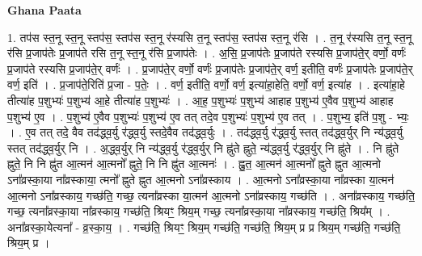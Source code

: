 \documentclass[17pt]{extarticle}
\begin{document}
\textbf{Ghana Paata } \newline

1. तप॑स स्त॒नू स्त॒नू स्तप॑स॒ स्तप॑स स्त॒नू र॑स्यसि त॒नू स्तप॑स॒ स्तप॑स स्त॒नू र॑सि । . त॒नू र॑स्यसि त॒नू स्त॒नू र॑सि प्र॒जाप॑तेः प्र॒जाप॑ते रसि त॒नू स्त॒नू र॑सि प्र॒जाप॑तेः । . अ॒सि॒ प्र॒जाप॑तेः प्र॒जाप॑ते रस्यसि प्र॒जाप॑ते॒र् वर्णो॒ वर्णः॑ प्र॒जाप॑ते रस्यसि प्र॒जाप॑ते॒र् वर्णः॑ । . प्र॒जाप॑ते॒र् वर्णो॒ वर्णः॑ प्र॒जाप॑तेः प्र॒जाप॑ते॒र् वर्ण॒ इतीति॒ वर्णः॑ प्र॒जाप॑तेः प्र॒जाप॑ते॒र् वर्ण॒ इति॑ । . प्र॒जाप॑ते॒रिति॑ प्र॒जा - प॒तेः॒ । . वर्ण॒ इतीति॒ वर्णो॒ वर्ण॒ इत्या॑हा॒हेति॒ वर्णो॒ वर्ण॒ इत्या॑ह । . इत्या॑हा॒हे तीत्या॑ह प॒शुभ्यः॑ प॒शुभ्य॑ आ॒हे तीत्या॑ह प॒शुभ्यः॑ । . आ॒ह॒ प॒शुभ्यः॑ प॒शुभ्य॑ आहाह प॒शुभ्य॑ ए॒वैव प॒शुभ्य॑ आहाह प॒शुभ्य॑ ए॒व । . प॒शुभ्य॑ ए॒वैव प॒शुभ्यः॑ प॒शुभ्य॑ ए॒व तत् तदे॒व प॒शुभ्यः॑ प॒शुभ्य॑ ए॒व तत् । . प॒शुभ्य॒ इति॑ प॒शु - भ्यः॒ । . ए॒व तत् तदे॒ वैव तद॑द्ध्व॒र्यु र॑द्ध्व॒र्यु स्तदे॒वैव तद॑द्ध्व॒र्युः । . तद॑द्ध्व॒र्यु र॑द्ध्व॒र्यु स्तत् तद॑द्ध्व॒र्युर् नि न्य॑द्ध्व॒र्यु स्तत् तद॑द्ध्व॒र्युर् नि । . अ॒द्ध्व॒र्युर् नि न्य॑द्ध्व॒र्यु र॑द्ध्व॒र्युर् नि ह्नु॑ते ह्नुते॒ न्य॑द्ध्व॒र्यु र॑द्ध्व॒र्युर् नि ह्नु॑ते । . नि ह्नु॑ते ह्नुते॒ नि नि ह्नु॑त आ॒त्मन॑ आ॒त्मनो᳚ ह्नुते॒ नि नि ह्नु॑त आ॒त्मनः॑ । . ह्नु॒त॒ आ॒त्मन॑ आ॒त्मनो᳚ ह्नुते ह्नुत आ॒त्मनो ऽना᳚व्रस्का॒या ना᳚व्रस्काया॒ त्मनो᳚ ह्नुते ह्नुत आ॒त्मनो ऽना᳚व्रस्काय । . आ॒त्मनो ऽना᳚व्रस्का॒या ना᳚व्रस्का या॒त्मन॑ आ॒त्मनो ऽना᳚व्रस्काय॒ गच्छ॑ति॒ गच्छ॒ त्यना᳚व्रस्का या॒त्मन॑ आ॒त्मनो ऽना᳚व्रस्काय॒ गच्छ॑ति । . अना᳚व्रस्काय॒ गच्छ॑ति॒ गच्छ॒ त्यना᳚व्रस्का॒या ना᳚व्रस्काय॒ गच्छ॑ति॒ श्रियꣳ॒॒ श्रिय॒म् गच्छ॒ त्यना᳚व्रस्का॒या ना᳚व्रस्काय॒ गच्छ॑ति॒ श्रिय᳚म् । . अना᳚व्रस्का॒येत्यना᳚ - व्र॒स्का॒य॒ । . गच्छ॑ति॒ श्रियꣳ॒॒ श्रिय॒म् गच्छ॑ति॒ गच्छ॑ति॒ श्रिय॒म् प्र प्र श्रिय॒म् गच्छ॑ति॒ गच्छ॑ति॒ श्रिय॒म् प्र । \newline
\end{document}
